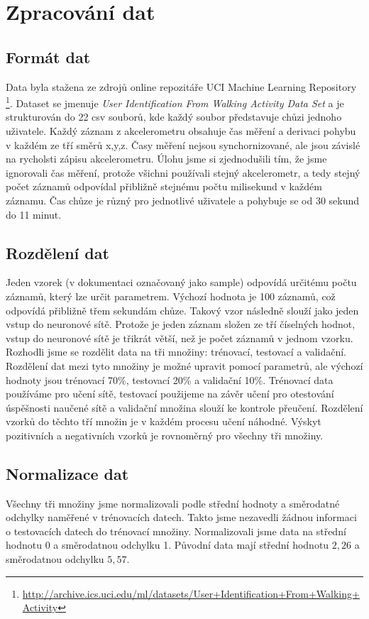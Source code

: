 \documentclass[a4paper, 10pt]{article}
\begin{document}
\section{Zpracování dat}
      \begin{multicols}{2}
    \subsection{Formát dat}
        Data byla stažena ze zdrojů online repozitáře UCI Machine Learning Repository \footnote{\url{http://archive.ics.uci.edu/ml/datasets/User+Identification+From+Walking+Activity}}. Dataset se jmenuje \textit{User Identification From Walking Activity Data Set}  a je strukturován do 22 csv souborů, kde každý soubor představuje chůzi jednoho uživatele. Každý záznam z akcelerometru obsahuje čas měření a derivaci pohybu v každém ze tří směrů x,y,z. Časy měření nejsou synchornizované, ale jsou závislé na rycholsti zápisu akcelerometru. Úlohu jsme si zjednodušili tím, že jsme ignorovali čas měření, protože všichni používali stejný akcelerometr, a tedy stejný počet záznamů odpovídal přibližně stejnému počtu milisekund v každém záznamu. Čas chůze je různý pro jednotlivé uživatele a pohybuje se od 30 sekund do 11 minut.
    \subsection{Rozdělení dat}
        Jeden vzorek (v dokumentaci označovaný jako sample) odpovídá určitému počtu záznamů, který lze určit parametrem. Výchozí hodnota je 100 záznamů, což odpovídá přibližně třem sekundám chůze. Takový vzor následně slouží jako jeden vstup do neuronové sítě. Protože je jeden záznam složen ze tří číselných hodnot, vstup do neuronové sítě je třikrát větší, než je počet záznamů v jednom vzorku.
        Rozhodli jsme se rozdělit data na tři množiny: trénovací, testovací a validační. Rozdělení dat mezi tyto množiny je možné upravit pomocí parametrů, ale výchozí hodnoty jsou trénovací 70\%, testovací 20\% a validační 10\%. Trénovací data používáme pro učení sítě, testovací použijeme na závěr učení pro otestování úspěšnosti naučené sítě a validační množina slouží ke kontrole přeučení. Rozdělení vzorků do těchto tří množin je v každém procesu učení náhodné. Výskyt pozitivních a negativních vzorků je rovnoměrný pro všechny tři množiny.

    \subsection{Normalizace dat}
        Všechny tři množiny jsme normalizovali podle střední hodnoty a směrodatné odchylky naměřené v trénovacích datech. Takto jsme nezavedli žádnou informaci o testovacích datech do trénovací množiny. Normalizovali jsme data na střední hodnotu 0 a směrodatnou odchylku 1. Původní data mají střední hodnotu $2,26$ a směrodatnou odchylku $5,57$.
      \end{multicols}
\end{document}
